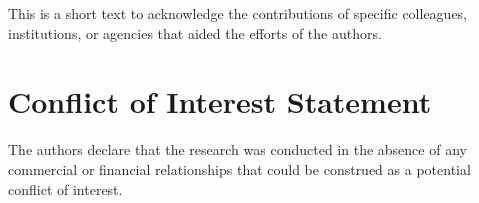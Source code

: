\documentclass[
  utf8]{FrontiersinHarvard}
\begin{document}
This is a short text to acknowledge the contributions of specific
colleagues, institutions, or agencies that aided the efforts of the
authors.

\section{Conflict of Interest
Statement}\label{conflict-of-interest-statement}

The authors declare that the research was conducted in the absence of
any commercial or financial relationships that could be construed as a
potential conflict of interest.



\end{document}
